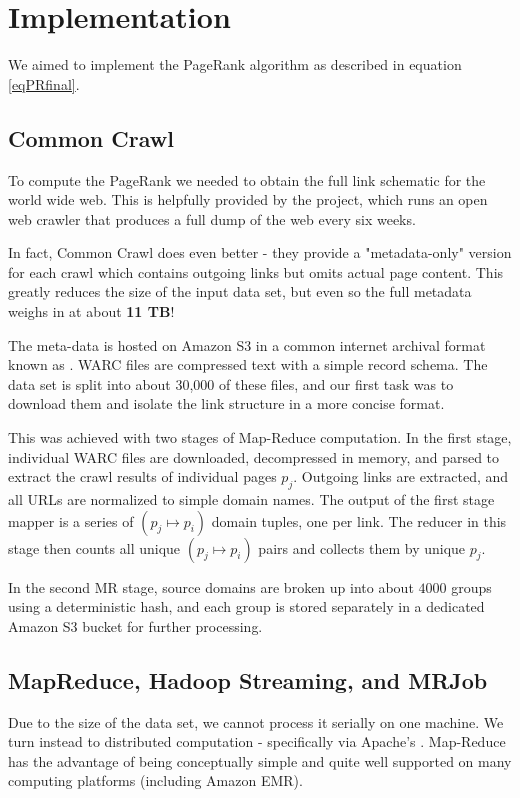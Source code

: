 \section{Implementation} \label{sec:impl}

We aimed to implement the PageRank algorithm as described in equation \eqref{eqPRfinal}.
    
\subsection{Common Crawl}
To compute the PageRank we needed to obtain the full link schematic for the 
world wide web.  This is helpfully provided by the  project,
which runs an open web crawler that produces a full dump of the web every six
weeks.

In fact, Common Crawl does even better - they provide a "metadata-only" version for
each crawl which contains outgoing links but omits actual page content.
This greatly reduces the size of the input data set, but even so the full metadata
weighs in at about \textbf{11 TB}!

The meta-data is hosted on Amazon S3 in a common internet archival format known 
as .  WARC files are compressed text with a simple record schema.
The data set is split into about 30,000 of these files, and our first task was
to download them and isolate the link structure in a more concise format.

This was achieved with two stages of Map-Reduce computation.  In the first stage,
individual WARC files are downloaded, decompressed in memory, and parsed to
extract the crawl results of individual pages $p_j$.  Outgoing links are 
extracted, and all URLs are normalized to simple domain names.
The output of the first stage mapper is a series of $(p_j \mapsto p_i)$ 
domain tuples, one per link.  The reducer in this stage then counts all unique
$(p_j \mapsto p_i)$ pairs and collects them by unique $p_j$. 

In the second MR stage, source domains are broken up into about $4000$ groups using
a deterministic hash, and each group is stored separately in a dedicated Amazon
S3 bucket for further processing.

\subsection{MapReduce, Hadoop Streaming, and MRJob}
Due to the size of the data set, we cannot process it serially on one machine.
We turn instead to distributed computation - specifically  via 
Apache's .  Map-Reduce has the advantage of being conceptually 
simple and quite well supported on many computing platforms (including Amazon EMR).


